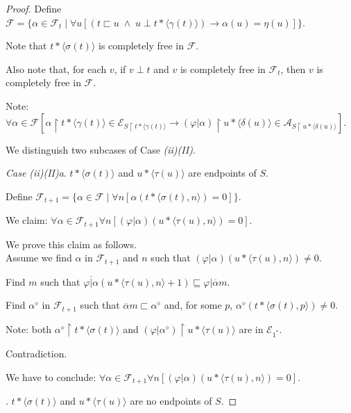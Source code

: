 \documentclass[a4paper]{amsart}
\theoremstyle{plain}
\begin{document}
\begin{proof}
Define $\mathcal{F}= \{\alpha \in \mathcal{F}_t \mid \forall u [(t\sqsubset u \;\wedge\;u\perp t\ast\langle \gamma(t)\rangle)\rightarrow \alpha(u)=\eta(u)]\}$. 

Note that $t\ast\langle\sigma(t)\rangle$ is completely free in $\mathcal{F}$. 

Also note that, for each $v$, if $v \perp t$ and $v$ is  completely free in $\mathcal{F}_t$, then $v$ is  completely free in $\mathcal{F}$. 

Note: $\forall \alpha \in \mathcal{F}[\alpha\upharpoonright t\ast\langle\gamma(t)\rangle \in \mathcal{E}_{S\upharpoonright t\ast\langle \gamma(t)\rangle }\rightarrow(\varphi|\alpha)\upharpoonright u\ast\langle\delta(u)\rangle \in \mathcal{A}_{S\upharpoonright u\ast\langle \delta(u)\rangle }]$.


\smallskip
We distinguish two subcases of Case {\it (ii)(II)}. 

\smallskip
{\it Case (ii)(II)a}. $t\ast \langle \sigma(t)\rangle$ and $u\ast\langle\tau(u)\rangle$ are endpoints of $S$.


Define $\mathcal{F}_{t+1}= \{\alpha \in \mathcal{F} \mid \forall n[\alpha(t\ast\langle \sigma(t), n \rangle)=0]\}$. 

We claim: $\forall \alpha \in \mathcal{F}_{t+1} \forall n[(\varphi|\alpha)(u\ast\langle \tau (u), n\rangle)=0]$.  

We prove this claim as follows. \\Assume we find $\alpha$ in $\mathcal{F}_{t+1}$ and $n$ such that $(\varphi|\alpha)(u\ast\langle \tau (u), n\rangle)\neq 0$.

Find $m$ such that $\overline{\varphi|\alpha}(u\ast\langle\tau(u),n\rangle +1)\sqsubseteq \varphi|\overline \alpha m$.

Find $\alpha^\diamond$ in $\mathcal{F}_{t+1}$ such that $\overline \alpha m \sqsubset \alpha^\diamond$ and, for some $p$, $\alpha^\diamond(t\ast\langle \sigma(t), p\rangle)\neq 0$.

Note: both $\alpha^\diamond\upharpoonright t\ast\langle \sigma(t)\rangle$ and $(\varphi|\alpha^\diamond)\upharpoonright u\ast\langle \tau(u)\rangle$ are in $\mathcal{E}_{1^\ast}$. 

Contradiction. 

We have to conclude: $\forall \alpha \in \mathcal{F}_{t+1} \forall n[(\varphi|\alpha)(u\ast\langle \tau (u), n\rangle)=0]$.  



. $t\ast\langle\sigma(t)\rangle$ and $u\ast\langle \tau(u)\rangle$ are no endpoints of $S$. 


\end{proof}
\end{document}
